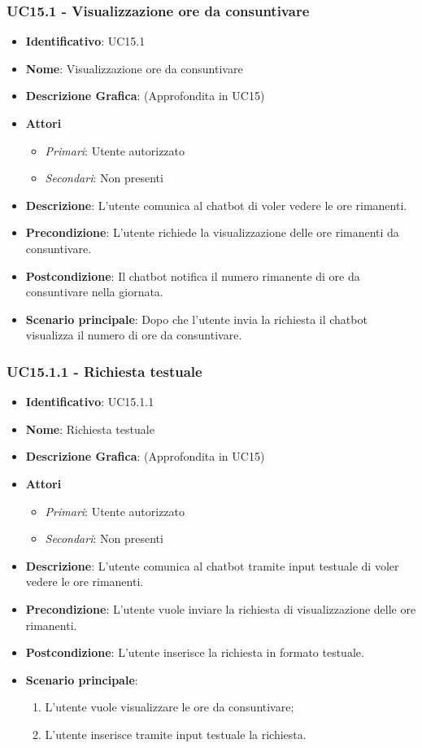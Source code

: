 \subsubsection{UC15.1 - Visualizzazione ore da consuntivare}
\begin{itemize}
	\item \textbf{Identificativo}: UC15.1
	\item \textbf{Nome}: Visualizzazione ore da consuntivare
	\item \textbf{Descrizione Grafica}: (Approfondita in UC15)
	\item \textbf{Attori}
	\begin{itemize} 
		\item \textit{Primari}: Utente autorizzato
		\item \textit{Secondari}: Non presenti
	\end{itemize}
	\item \textbf{Descrizione}: L'utente comunica al chatbot di voler vedere le ore rimanenti.
	\item \textbf{Precondizione}: L'utente richiede la visualizzazione delle ore rimanenti da consuntivare.
	\item \textbf{Postcondizione}: Il chatbot notifica il numero rimanente di ore da consuntivare nella giornata.
	\item \textbf{Scenario principale}: Dopo che l'utente invia la richiesta il chatbot visualizza il numero di ore da consuntivare.
\end{itemize}

\subsubsection{UC15.1.1 - Richiesta testuale}
\begin{itemize}
	\item \textbf{Identificativo}: UC15.1.1
	\item \textbf{Nome}: Richiesta testuale
	\item \textbf{Descrizione Grafica}: (Approfondita in UC15)
	\item \textbf{Attori}
	\begin{itemize} 
		\item \textit{Primari}: Utente autorizzato
		\item \textit{Secondari}: Non presenti
	\end{itemize}
	\item \textbf{Descrizione}: L'utente comunica al chatbot tramite input testuale di voler vedere le ore rimanenti.
	\item \textbf{Precondizione}: L'utente vuole inviare la richiesta di visualizzazione delle ore rimanenti.
	\item \textbf{Postcondizione}: L'utente inserisce la richiesta in formato testuale.
	\item \textbf{Scenario principale}:
	\begin{enumerate}
		\item L'utente vuole visualizzare le ore da consuntivare;
		\item L'utente inserisce tramite input testuale la richiesta.
	\end{enumerate}
\end{itemize}

